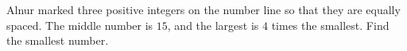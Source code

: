 Alnur marked three positive integers on the number line so that they are equally spaced. The middle number is $15$, and the largest is $4$ times the smallest. Find the smallest number.
